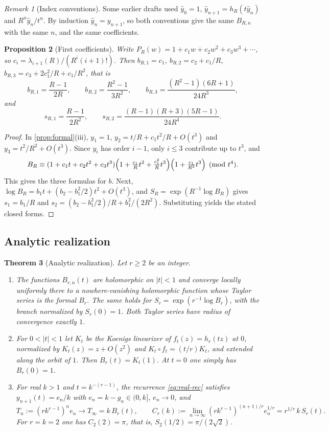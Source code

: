 \documentclass[11pt,reqno]{amsart}
\newtheorem{theorem}{Theorem}[section]
\newtheorem{proposition}[theorem]{Proposition}
\theoremstyle{definition}
\theoremstyle{remark}
\newtheorem{remark}[theorem]{Remark}
\theoremstyle{plain}
\begin{document}
\begin{remark}[Index conventions]\label{rem:index}
Some earlier drafts used $\widehat y_0=1$, $\widehat y_{n+1}=h_R(t\widehat y_n)$ and $R^n\widehat y_n/t^n$. By induction $\widehat y_n=y_{n+1}$, so both conventions give the same $B_{R,n}$ with the same $n$, and the same coefficients.
\end{remark}

\begin{proposition}[First coefficients]\label{prop:first}
Write $P_R(w)=1+c_1w+c_2w^2+c_3w^3+\cdots$, so $c_i=\lambda_{i+1}(R)/(R^i(i+1)!)$. Then $b_{R,1}=c_1$, $b_{R,2}=c_2+c_1/R$, $b_{R,3}=c_3+2c_1^2/R+c_1/R^2$, that is
\[
b_{R,1}=\frac{R-1}{2R},\qquad b_{R,2}=\frac{R^2-1}{3R^2},\qquad b_{R,3}=\frac{(R^2-1)(6R+1)}{24R^3},
\]
and
\[
s_{R,1}=\frac{R-1}{2R^2},\qquad s_{R,2}=\frac{(R-1)(R+3)(5R-1)}{24R^4}.
\]
\end{proposition}

\begin{proof}
In \cref{prop:formal}(iii), $y_1=1$, $y_2=t/R+c_1t^2/R+O(t^3)$ and $y_3=t^2/R^2+O(t^3)$. Since $y_i$ has order $i-1$, only $i\le3$ contribute up to $t^3$, and
\[
B_R\equiv(1+c_1t+c_2t^2+c_3t^3)\Bigl(1+\tfrac{c_1}{R}t^2+\tfrac{c_1^2}{R}t^3\Bigr)\Bigl(1+\tfrac{c_1}{R^2}t^3\Bigr)\pmod{t^4}.
\]
This gives the three formulas for $b$. Next, $\log B_R=b_1t+(b_2-b_1^2/2)t^2+O(t^3)$, and $S_R=\exp(R^{-1}\log B_R)$ gives $s_1=b_1/R$ and $s_2=(b_2-b_1^2/2)/R+b_1^2/(2R^2)$. Substituting yields the stated closed forms.
\end{proof}

\subsection{Analytic realization}

\begin{theorem}[Analytic realization]\label{thm:analytic}
Let $r\ge2$ be an integer.
\begin{enumerate}[label=\textup{(\roman*)}]
\item The functions $B_{r,n}(t)$ are holomorphic on $|t|<1$ and converge locally uniformly there to a nowhere-vanishing holomorphic function whose Taylor series is the formal $B_r$. The same holds for $S_r=\exp(r^{-1}\log B_r)$, with the branch normalized by $S_r(0)=1$. Both Taylor series have radius of convergence exactly $1$.
\item For $0<|t|<1$ let $K_t$ be the Koenigs linearizer of $f_t(z)=h_r(tz)$ at $0$, normalized by $K_t(z)=z+O(z^2)$ and $K_t\circ f_t=(t/r)K_t$, and extended along the orbit of $1$. Then $B_r(t)=K_t(1)$. At $t=0$ one simply has $B_r(0)=1$.
\item For real $k>1$ and $t=k^{-(r-1)}$, the recurrence \eqref{eq:real-rec} satisfies $y_{n+1}(t)=e_n/k$ with $e_n=k-g_n\in(0,k]$, $e_n\to0$, and
\[
T_n:=(rk^{r-1})^ne_n\longrightarrow T_\infty=k\,B_r(t),\qquad
C_r(k):=\lim_{n\to\infty}(rk^{r-1})^{(n+1)/r}e_n^{1/r}=r^{1/r}\,k\,S_r(t).
\]
For $r=k=2$ one has $C_2(2)=\pi$, that is, $S_2(1/2)=\pi/(2\sqrt2)$.
\end{enumerate}
\end{theorem}
\end{document}
